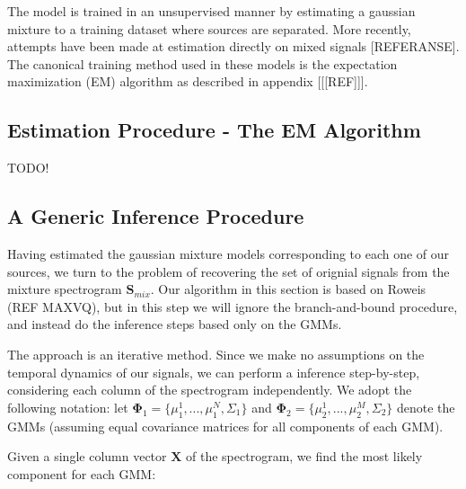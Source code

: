 \documentclass[11pt, oneside, a4paper]{report}
\begin{document}
The model is trained in an unsupervised manner by estimating a
gaussian mixture to a training dataset where sources are
separated. More recently, attempts have been made at estimation
directly on mixed signals [REFERANSE]. The canonical training method
used in these models is the expectation maximization (EM) algorithm as
described in appendix [[[REF]]]. 


\subsection{Estimation Procedure - The EM Algorithm}

TODO!


\subsection{A Generic Inference Procedure}

Having estimated the gaussian mixture models 
corresponding to each one of our sources, we turn to the problem of recovering the set of
orignial signals from the mixture spectrogram $\boldsymbol{S}_{mix}$. Our algorithm in this section
is based on Roweis (REF MAXVQ), but in this step we will ignore the branch-and-bound procedure,
and instead do the inference steps based only on the GMMs.

The approach is an iterative method. Since we make no assumptions on the temporal dynamics of
our signals, we can perform a inference step-by-step, considering each column of the spectrogram
independently. We adopt the following notation: let $\boldsymbol{\Phi}_1 = \{ \mu_1^1,...,\mu_1^N, \Sigma_1 \}$
and $\boldsymbol{\Phi}_2 = \{ \mu_2^1,...,\mu_2^M, \Sigma_2 \} $ denote the GMMs (assuming equal covariance
matrices for all components of each GMM).

Given a single column vector $\boldsymbol{X}$ of the spectrogram, we find the 
most likely component for each GMM:
\end{document}
